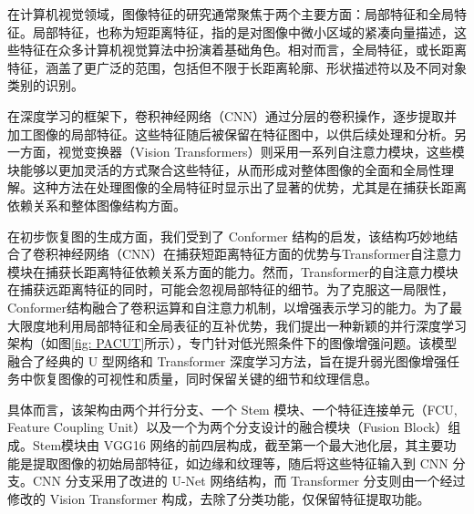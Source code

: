 \documentclass[a4paper]{ctexart}
\begin{document}
	在计算机视觉领域，图像特征的研究通常聚焦于两个主要方面：局部特征和全局特征。局部特征，也称为短距离特征，指的是对图像中微小区域的紧凑向量描述，这些特征在众多计算机视觉算法中扮演着基础角色\cite{jain1991unsupervised, lowe2004distinctive, ojala2002multiresolution}。相对而言，全局特征，或长距离特征，涵盖了更广泛的范围，包括但不限于长距离轮廓\cite{lisin2005combining}、形状描述符以及不同对象类别的识别。
	
	在深度学习的框架下，卷积神经网络（CNN）通过分层的卷积操作，逐步提取并加工图像的局部特征。这些特征随后被保留在特征图中，以供后续处理和分析。另一方面，视觉变换器（Vision Transformers）则采用一系列自注意力模块，这些模块能够以更加灵活的方式聚合这些特征，从而形成对整体图像的全面和全局性理解。这种方法在处理图像的全局特征时显示出了显著的优势，尤其是在捕获长距离依赖关系和整体图像结构方面。
	
	在初步恢复图的生成方面，我们受到了 Conformer 结构\cite{peng2021conformer}的启发，该结构巧妙地结合了卷积神经网络（CNN）在捕获短距离特征\cite{jain1991unsupervised, lowe2004distinctive, ojala2002multiresolution}方面的优势与Transformer自注意力模块在捕获长距离特征\cite{lisin2005combining}依赖关系方面的能力。然而，Transformer的自注意力模块在捕获远距离特征的同时，可能会忽视局部特征的细节。为了克服这一局限性，Conformer结构融合了卷积运算和自注意力机制，以增强表示学习的能力。为了最大限度地利用局部特征和全局表征的互补优势，我们提出一种新颖的并行深度学习架构（如图\ref{fig: PACUT}所示），专门针对低光照条件下的图像增强问题。该模型融合了经典的 U 型网络和 Transformer 深度学习方法，旨在提升弱光图像增强任务中恢复图像的可视性和质量，同时保留关键的细节和纹理\cite{karu1996there}信息。
	
	具体而言，该架构由两个并行分支、一个 Stem 模块、一个特征连接单元（FCU, Feature Coupling Unit）以及一个为两个分支设计的融合模块（Fusion Block）组成。Stem模块由 VGG16 网络的前四层构成\cite{szegedy2016rethinking}，截至第一个最大池化层，其主要功能是提取图像的初始局部特征，如边缘和纹理等，随后将这些特征输入到 CNN 分支。CNN 分支采用了改进的 U-Net 网络结构，而 Transformer 分支则由一个经过修改的 Vision Transformer 构成，去除了分类功能，仅保留特征提取功能。
	
\end{document}
